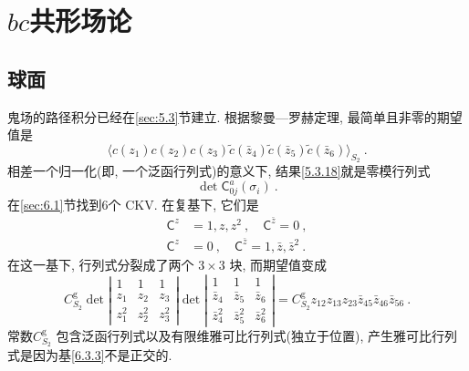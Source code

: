 \newpage

\section{$bc$共形场论} \label{sec:6.3}

\subsection*{球面}

鬼场的路径积分已经在\ref{sec:5.3}节建立. 根据黎曼—罗赫定理, 最简单且非零的期望值是
\begin{equation}
	\langle c(z_{1}) c(z_{2}) c(z_{3}) \tilde{c}(\bar{z}_{4}) \tilde{c}(\bar{z}_{5}) \tilde{c}(\bar{z}_{6})\rangle_{S_{2}} \:. \label{6.3.1}
\end{equation}
相差一个归一化(即, 一个泛函行列式)的意义下, 结果\eqref{5.3.18}就是零模行列式
\begin{equation}
	\operatorname{det} \mathsf{C}_{0 j}^{a}(\sigma_{i}) \:. \label{6.3.2}
\end{equation}
在\ref{sec:6.1}节找到6个 CKV. 在复基下, 它们是
\begin{subequations} \label{6.3.3}
\begin{align}
\mathsf{C}^{z} &= 1, z, z^{2}\:, \quad \mathsf{C}^{\bar{z}}=0  \:, \label{6.3.3a} \\
\mathsf{C}^{z} &= 0\:, \quad \mathsf{C}^{\bar{z}}=1, \bar{z}, \bar{z}^{2} \:. \label{6.3.3b}
\end{align}
\end{subequations}
在这一基下, 行列式分裂成了两个 $3 \times 3$ 块, 而期望值变成
\begin{equation}
	C_{S_{2}}^{\mathrm{g}} \operatorname{det}\left|\begin{array}{ccc}
		1 & 1 & 1 \\
		z_{1} & z_{2} & z_{3} \\
		z_{1}^{2} & z_{2}^{2} & z_{3}^{2}
	\end{array}\right| \operatorname{det}\left|\begin{array}{ccc}
		1 & 1 & 1 \\
		\bar{z}_{4} & \bar{z}_{5} & \bar{z}_{6} \\
		\bar{z}_{4}^{2} & \bar{z}_{5}^{2} & \bar{z}_{6}^{2}
	\end{array}\right|=C_{S_{2}}^{\mathrm{g}} z_{12} z_{13} z_{23} \bar{z}_{45} \bar{z}_{46} \bar{z}_{56} \:. \label{6.3.4}
\end{equation}
常数$C_{S_{2}}^{\mathrm{g}}$ 包含泛函行列式以及有限维雅可比行列式(独立于位置), 产生雅可比行列式是因为基\eqref{6.3.3}不是正交的. 

